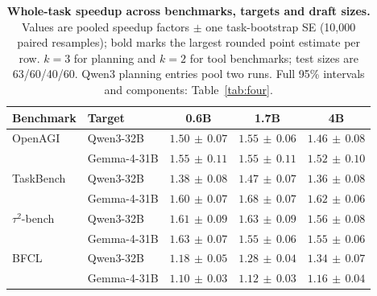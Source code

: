 \begin{table}[htbp]
\centering\small\setlength{\tabcolsep}{6pt}\renewcommand{\arraystretch}{1.07}
\caption{\textbf{Whole-task speedup across benchmarks, targets and draft sizes.} Values are pooled
speedup factors $\pm$ one task-bootstrap SE (10,000 paired resamples); bold marks the largest rounded
point estimate per row. $k=3$ for planning and $k=2$ for tool benchmarks; test sizes are 63/60/40/60.
Qwen3 planning entries pool two runs. Full 95\% intervals and components: Table~\ref{tab:four}.}
\label{tab:main_results}
\begin{tabular}{llccc}
\toprule
Benchmark & Target & 0.6B & 1.7B & 4B \\
\midrule
OpenAGI & Qwen3-32B & $1.50\,\pm\,0.07$ & $\mathbf{1.55}\,\pm\,0.06$ & $1.46\,\pm\,0.08$ \\
 & Gemma-4-31B & $\mathbf{1.55}\,\pm\,0.11$ & $\mathbf{1.55}\,\pm\,0.11$ & $1.52\,\pm\,0.10$ \\
\addlinespace[3pt]
TaskBench & Qwen3-32B & $1.38\,\pm\,0.08$ & $\mathbf{1.47}\,\pm\,0.07$ & $1.36\,\pm\,0.08$ \\
 & Gemma-4-31B & $1.60\,\pm\,0.07$ & $\mathbf{1.68}\,\pm\,0.07$ & $1.62\,\pm\,0.06$ \\
\addlinespace[3pt]
$\tau^2$-bench & Qwen3-32B & $1.61\,\pm\,0.09$ & $\mathbf{1.63}\,\pm\,0.09$ & $1.56\,\pm\,0.08$ \\
 & Gemma-4-31B & $\mathbf{1.63}\,\pm\,0.07$ & $1.55\,\pm\,0.06$ & $1.55\,\pm\,0.06$ \\
\addlinespace[3pt]
BFCL & Qwen3-32B & $1.18\,\pm\,0.05$ & $1.28\,\pm\,0.04$ & $\mathbf{1.34}\,\pm\,0.07$ \\
 & Gemma-4-31B & $1.10\,\pm\,0.03$ & $1.12\,\pm\,0.03$ & $\mathbf{1.16}\,\pm\,0.04$ \\
\bottomrule
\end{tabular}
\end{table}
